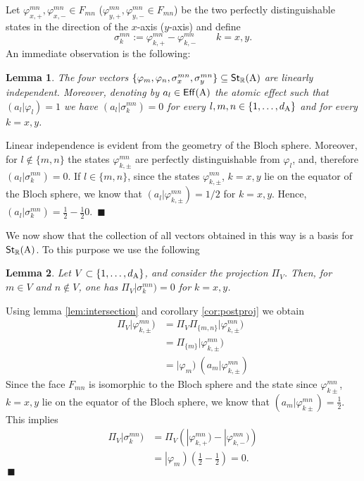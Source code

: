 \documentclass[12pt,aps,pra,showpacs,groupedaddress]{revtex4-1}
\newtheorem{lemma}{Lemma} \newtheorem{proposition}{Proposition}
\def\Proof{\medskip\par\noindent{\bf Proof. }}
\def\qed{$\,\blacksquare$\par}
\def\Cntset{{\mathsf{Eff}}}
\def\Stset{{\mathsf{St}}}
\def\K#1{\left|#1\right)}  \def\B#1{\left(#1\right|}
\def\SC#1#2{\left(#1\right|\left.\!#2\right)}  \def\Tr{{\rm Tr}}
\def\Reals{{\mathbb R}}
\begin{document}
Let $\varphi_{x, +}^{mn}, \varphi_{x, -}^{mn} \in F_{mn}$ ($\varphi_{y, +}^{mn},\varphi_{y,
  -}^{mn} \in F_{mn}$) be the two perfectly distinguishable states in the direction of the
$x$-axis ($y$-axis) and define
\begin{equation}\label{def:sigmaxyz}
\sigma_{k}^{mn} := \varphi_{k,+}^{mn} - \varphi_{k,-}^{mn} \qquad k =x,y . 
\end{equation} 
An immediate observation is the following:  
\begin{lemma}\label{lem:trivialfrombloch}
The four vectors $\{ \varphi_m, \varphi_n, \sigma_x^{mn}, \sigma_y^{mn} \} \subseteq
\Stset_{\Reals} (\rA)$ are linearly independent. Moreover, denoting by $a_l \in \Cntset (\rA)$ the atomic effect such that $\SC {a_l}{\varphi_l}  = 1$ we have $\SC {a_l}{\sigma^{mn}_k}  =  0$ for every $l,m,n  \in \{1, \dots, d_{\rm A}\}$ and for every $k = x,y$. 
\end{lemma}
\Proof  Linear independence is evident from the geometry of the Bloch sphere.  Moreover, for $ l \not \in  \{m,n\}$ the states $\varphi_{k , \pm}^{mn}$ are perfectly distinguishable from $\varphi_l$, and, therefore $\SC {a_l} {\sigma_k^{mn}}  =  0$.   If $l \in \{m,n\} $, since the states  $\varphi_{k , \pm}^{mn}$, $k = x,y$ lie on the equator of the  Bloch sphere, we know that $\SC {a_l}  {\varphi_{k,\pm}^{mn}}  =  1/2$  for $k = x,y$.  Hence, $\SC {a_l} {\sigma_k^{mn}}  =\frac  12 - \frac 12  0$.  \qed

We now show that the collection of all vectors obtained in this way is a basis for $\Stset_{\Reals}
(\rA)$.  To this purpose we use the following
\begin{lemma}Let $V\subset\{1,\dots,d_{\rm A}\}$, and consider the
  projection $\Pi_V$. Then, for $m\in V$ and $n\not\in V$, one has
  $\Pi_V|\sigma_{k}^{mn})=0$ for $k=x,y$.
  \label{lem:proj}
\end{lemma}

\Proof Using lemma \ref{lem:intersection} and corollary
\ref{cor:postproj} we obtain
\begin{equation*}
  \begin{split}
    \Pi_{V}|\varphi_{k,\pm}^{mn})&=\Pi_{V}\Pi_{\{m,n\}}|\varphi_{k,\pm}^{mn})\\
    &=\Pi_{\{m\}}|\varphi_{k, \pm}^{mn})\\
    &= |\varphi_m) ~ (a_m|\varphi_{k,\pm}^{mn})
  \end{split}
\end{equation*}
Since the face $F_{mn}$  is isomorphic to the Bloch sphere and the state since $\varphi_{k\pm}^{mn}$, $k = x,y$ lie on the equator of the Bloch sphere, we know that
$(a_m|\varphi_{k\pm}^{mn})=\frac12$. This implies
\begin{align*} 
  \Pi_{V}|\sigma_{k}^{mn}) & =  \Pi_{V}     \left (  |\varphi_{k,+}^{mn}) -  |\varphi_{k,-}^{mn}) \right)\\
  & =\K{\varphi_m} \left (\frac 12 - \frac 12 \right) =0 .
 \end{align*} \qed
\end{document}
